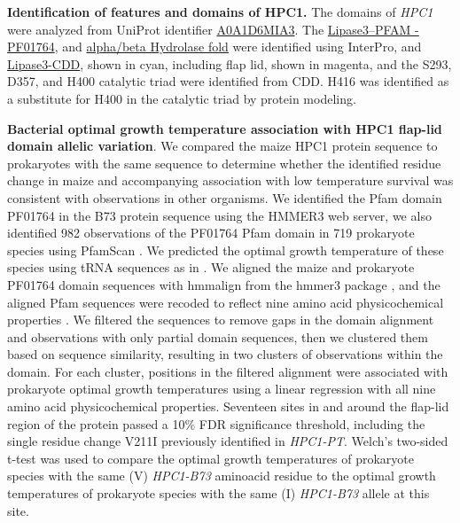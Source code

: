 \documentclass[9pt,twocolumn,twoside,lineno]{biorxiv}
\newcommand{\hpc}{\textit{HPC1}\xspace}
\begin{document}
\textbf{Identification of features and domains of HPC1.}
The domains of \hpc were analyzed from UniProt identifier \hyperlink{https://www.uniprot.org/uniprot/A0A1D6MIA3}{A0A1D6MIA3}. 
The \hyperlink{https://www.ebi.ac.uk/interpro/entry/pfam/PF01764/}{Lipase3--PFAM - PF01764}, and \hyperlink{https://www.ebi.ac.uk/interpro/entry/InterPro/IPR029058/}{alpha/beta Hydrolase fold} were identified using InterPro, and \hyperlink{https://www.ncbi.nlm.nih.gov/Structure/cdd/cddsrv.cgi?uid=cd00519}{Lipase3-CDD}, shown in cyan, including flap lid, shown in magenta, and the S293, D357, and H400 catalytic triad were identified from CDD. 
H416 was identified as a substitute for H400 in the catalytic triad by protein modeling.

\textbf{Bacterial optimal growth temperature association with HPC1 flap-lid domain allelic variation}.
We compared the maize HPC1 protein sequence to prokaryotes with the same sequence to determine whether the identified residue change in maize and accompanying association with low temperature survival was consistent with observations in other organisms. 
We identified the Pfam domain PF01764 in the B73 protein sequence using the HMMER3 web server, we also identified 982 observations of the PF01764 Pfam domain in 719 prokaryote species using PfamScan \cite{Potter2018-tk, El-Gebali2019-pw}. 
We predicted the optimal growth temperature of these species using tRNA sequences as in \cite{Cimen2020-dm}. 
We aligned the maize and prokaryote PF01764 domain sequences with hmmalign from the hmmer3 package \cite{Eddy2011-pd}, and the aligned Pfam sequences were recoded to reflect nine amino acid physicochemical properties \cite{Li2016-ut}. 
We filtered the sequences to remove gaps in the domain alignment and observations with only partial domain sequences, then we clustered them based on sequence similarity, resulting in two clusters of observations within the domain. 
For each cluster, positions in the filtered alignment were associated with prokaryote optimal growth temperatures using a linear regression with all nine amino acid physicochemical properties. 
Seventeen sites in and around the flap-lid region of the protein passed a 10\% FDR significance threshold, including the single residue change V211I previously identified in \textit{HPC1-PT}. 
Welch’s two-sided t-test was used to compare the optimal growth temperatures of prokaryote species with the same (V) \textit{HPC1-B73} aminoacid residue to the optimal growth temperatures of prokaryote species with the same (I) \textit{HPC1-B73} allele at this site.
\end{document}
